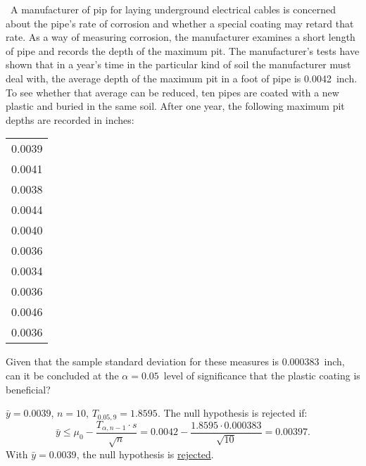 \begin{problem}
  ~A manufacturer of pip for laying underground electrical cables is concerned about the pipe's rate of corrosion and whether a special coating may retard that rate. As a way of measuring corrosion, the manufacturer examines a short length of pipe and records the depth of the maximum pit. The manufacturer's tests have shown that in a year's time in the particular kind of soil the manufacturer must deal with, the average depth of the maximum pit in a foot of pipe is 0.0042~inch.  To see whether that average can be reduced, ten pipes are coated with a new plastic and buried in the same soil. After one year, the following maximum pit depths are recorded in inches:
  \begin{tabular}{c}
    \toprule
    0.0039 \\
    0.0041 \\
    0.0038 \\
    0.0044 \\
    0.0040 \\
    0.0036 \\
    0.0034 \\
    0.0036 \\
    0.0046 \\
    0.0036 \\\bottomrule
  \end{tabular}
  \noindent
  Given that the sample standard deviation for these measures is 0.000383~inch, can it be concluded at the ${\alpha= 0.05}$~level of significance that the plastic coating is beneficial?
\end{problem}

${\bar{y} = 0.0039}$, ${n= 10}$, ${T_{0.05,9} = 1.8595}$. The null hypothesis is rejected if:
\begin{equation}
  \bar{y} \leq \mu_{0} - \frac{T_{\alpha,n-1} \cdot s}{\sqrt{n}} = 0.0042 - \frac{1.8595 \cdot 0.000383}{\sqrt{10}} = 0.00397\text{.}
\end{equation}
\noindent
With ${\bar{y} = 0.0039}$, the null hypothesis is \underline{rejected}.
